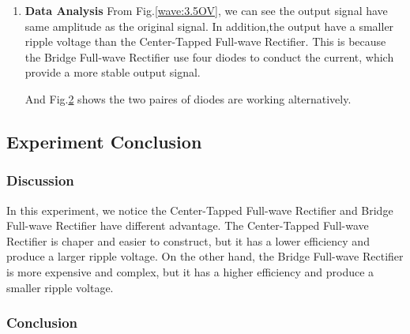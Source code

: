 \begin{enumerate}[I]
\begin{figure}[H]
\begin{subfigure}{0.4\textwidth}
                    \caption{Diode Voltage}
                    \label{wave:3.5DV}
                \end{subfigure}
            \end{figure}
        \FloatBarrier
        \item \textbf{Data Analysis}\newline
            From Fig.\ref{wave:3.5OV}, we can see the output signal have same amplitude as the original signal. In addition,the output have a smaller ripple voltage than the Center-Tapped Full-wave Rectifier. This is because the Bridge Full-wave Rectifier use four diodes to conduct the current, which provide a more stable output signal.\par
            
            And Fig.\ref{wave:3.5DV} shows the two paires of diodes are working alternatively.
    \end{enumerate}
    
\subsection{Experiment Conclusion}
    \subsubsection{Discussion}
        In this experiment, we notice the Center-Tapped Full-wave Rectifier and Bridge Full-wave Rectifier have different advantage. The Center-Tapped Full-wave Rectifier is chaper and easier to construct, but it has a lower efficiency and produce a larger ripple voltage. On the other hand, the Bridge Full-wave Rectifier is more expensive and complex, but it has a higher efficiency and produce a smaller ripple voltage.
    \subsubsection{Conclusion}